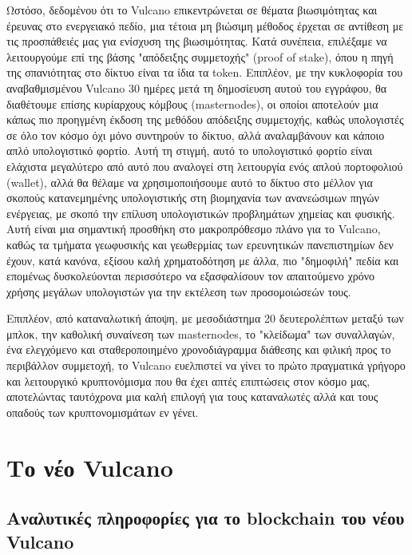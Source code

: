 \documentclass[A4paper, 12pt]{article}
\begin{document}
Ωστόσο, δεδομένου ότι το Vulcano επικεντρώνεται σε θέματα βιωσιμότητας και έρευνας στο ενεργειακό πεδίο, μια τέτοια μη βιώσιμη μέθοδος έρχεται σε αντίθεση με τις προσπάθειές μας για ενίσχυση της βιωσιμότητας. Κατά συνέπεια, επιλέξαμε να λειτουργούμε επί της βάσης "απόδειξης συμμετοχής" (proof of stake), όπου η πηγή της σπανιότητας στο δίκτυο είναι τα ίδια τα token. Επιπλέον, με την κυκλοφορία του αναβαθμισμένου Vulcano 30 ημέρες μετά τη δημοσίευση αυτού του εγγράφου, θα διαθέτουμε επίσης κυρίαρχους κόμβους (masternodes), οι οποίοι αποτελούν μια κάπως πιο προηγμένη έκδοση της μεθόδου απόδειξης συμμετοχής, καθώς υπολογιστές σε όλο τον κόσμο όχι μόνο συντηρούν το δίκτυο, αλλά αναλαμβάνουν και κάποιο απλό υπολογιστικό φορτίο. Αυτή τη στιγμή, αυτό το υπολογιστικό φορτίο είναι ελάχιστα μεγαλύτερο από αυτό που αναλογεί στη λειτουργία ενός απλού πορτοφολιού (wallet), αλλά θα θέλαμε να χρησιμοποιήσουμε αυτό το δίκτυο στο μέλλον για σκοπούς κατανεμημένης υπολογιστικής στη βιομηχανία των ανανεώσιμων πηγών ενέργειας, με σκοπό την επίλυση υπολογιστικών προβλημάτων χημείας και φυσικής. Αυτή είναι μια σημαντική προσθήκη στο μακροπρόθεσμο πλάνο για το Vulcano, καθώς τα τμήματα γεωφυσικής και γεωθερμίας των ερευνητικών πανεπιστημίων δεν έχουν, κατά κανόνα, εξίσου καλή χρηματοδότηση με άλλα, πιο "δημοφιλή" πεδία και επομένως δυσκολεύονται περισσότερο να εξασφαλίσουν τον απαιτούμενο χρόνο χρήσης μεγάλων υπολογιστών για την εκτέλεση των προσομοιώσεών τους.

Επιπλέον, από καταναλωτική άποψη, με μεσοδιάστημα 20 δευτερολέπτων μεταξύ των μπλοκ, την καθολική συναίνεση των masternodes, το "κλείδωμα" των συναλλαγών, ένα ελεγχόμενο και σταθεροποιημένο χρονοδιάγραμμα διάθεσης και φιλική προς το περιβάλλον συμμετοχή, το Vulcano ευελπιστεί να γίνει το πρώτο πραγματικά γρήγορο και λειτουργικό κρυπτονόμισμα που θα έχει απτές επιπτώσεις στον κόσμο μας, αποτελώντας ταυτόχρονα μια καλή επιλογή για τους καταναλωτές αλλά και τους οπαδούς των κρυπτονομισμάτων εν γένει.

\section{Το νέο Vulcano}
\subsection{Αναλυτικές πληροφορίες για το blockchain του νέου Vulcano}
\end{document}
